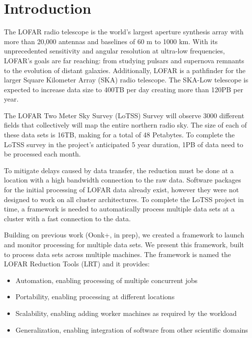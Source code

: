 %

% 
\setcounter{footnote}{0}

\section{Introduction}
The LOFAR radio telescope is the world's largest aperture synthesis array with more than 20,000 antennas and baselines of 60 m to 1000 km\cite{van2013lofar}. With its unprecedented sensitivity and angular resolution at ultra-low frequencies, LOFAR's goals are far reaching: from studying pulsars and supernova remnants to the evolution of distant galaxies. Additionally, LOFAR is a pathfinder for the larger Square Kilometer Array (SKA) radio telescope. The SKA-Low telescope is expected to increase data size\cite{lofar_data} to 400TB per day creating more than 120PB per year\cite{ska_cloud_memo}. 

The LOFAR Two Meter Sky Survey (LoTSS) Survey\cite{lotss} will observe 3000 different fields that collectively will map the entire northern radio sky. The size of each of these data sets is 16TB, making for a total of 48 Petabytes. To complete the LoTSS survey in the project's anticipated 5 year duration, 1PB of data need to be processed each month. 

To mitigate delays caused by data transfer, the reduction must be done at a location with a high bandwidth connection to the raw data. Software packages for the initial processing of LOFAR data already exist\cite{van2016lofar}, however they were not designed to work on all cluster architectures. To complete the LoTSS project in time, a framework is needed to automatically process multiple data sets at a cluster with a fast connection to the data. 

Building on previous work (Oonk+, in prep), we created a framework to launch and monitor processing for multiple data sets. We present this framework, built to process data sets across multiple machines. The framework is named the LOFAR Reduction Tools (LRT) and it provides:

\begin{itemize}[noitemsep,topsep=0pt]
 \item Automation, enabling processing of multiple concurrent jobs
 \item Portability, enabling processing at different locations 
 \item Scalability, enabling adding worker machines as required by the workload
 \item Generalization, enabling integration of software from other scientific domains
\end{itemize}

